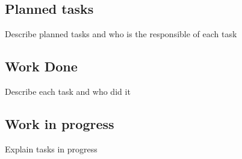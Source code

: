 \documentclass[preprint,12pt]{elsarticle}
\begin{document}
\subsection{Planned tasks}

Describe planned tasks  and who is the responsible of each task

\subsection{Work Done}

Describe each task and who did it 

\subsection{Work in progress}

Explain tasks in progress \\












\end{document}
